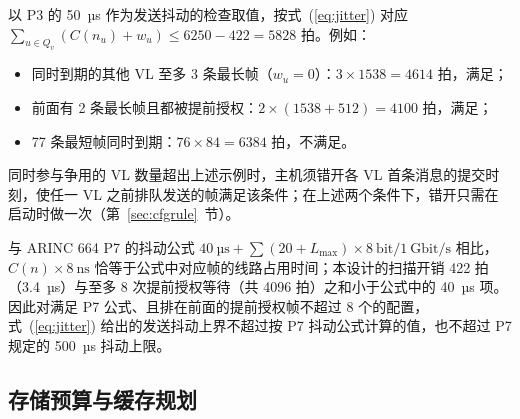 以 P3 的 50~µs 作为发送抖动的检查取值，按式~(\ref{eq:jitter}) 对应 $\sum_{u\in Q_v}(C(n_u)+w_u) \le 6250-422 = 5828$ 拍。例如：
\begin{itemize}
  \item 同时到期的其他 VL 至多 3 条最长帧（$w_u=0$）：$3\times 1538 = 4614$ 拍，满足；
  \item 前面有 2 条最长帧且都被提前授权：$2\times(1538+512) = 4100$ 拍，满足；
  \item 77 条最短帧同时到期：$76 \times 84 = 6384$ 拍，不满足。
\end{itemize}
同时参与争用的 VL 数量超出上述示例时，主机须错开各 VL 首条消息的提交时刻，使任一 VL 之前排队发送的帧满足该条件；在上述两个条件下，错开只需在启动时做一次（第~\ref{sec:cfgrule}~节）。

与 ARINC 664 P7 的抖动公式 $40~\text{µs} + \sum(20+L_\text{max})\times 8~\text{bit}/1~\text{Gbit/s}$ 相比，$C(n)\times 8~\text{ns}$ 恰等于公式中对应帧的线路占用时间；本设计的扫描开销 422 拍（3.4~µs）与至多 8 次提前授权等待（共 4096 拍）之和小于公式中的 40~µs 项。因此对满足 P7 公式、且排在前面的提前授权帧不超过 8 个的配置，式~(\ref{eq:jitter}) 给出的发送抖动上界不超过按 P7 抖动公式计算的值，也不超过 P7 规定的 500~µs 抖动上限。

\subsection{存储预算与缓存规划}\label{sec:bufbudget}

